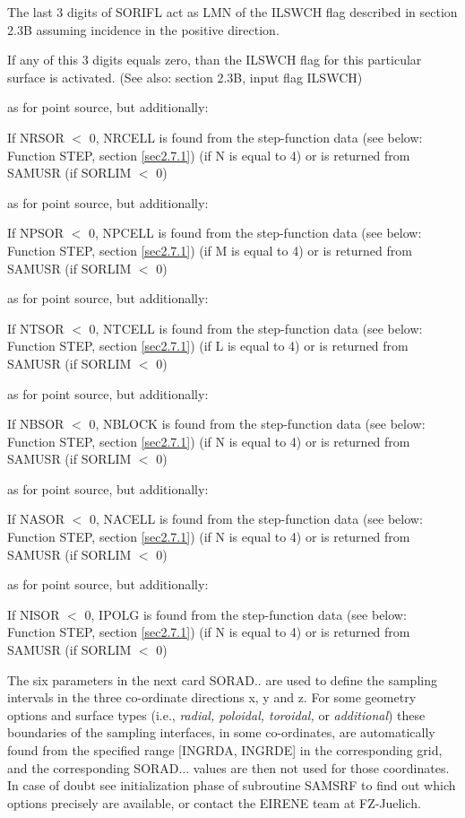 \begin{list}{ }{}
The last 3 digits of SORIFL act as LMN of the ILSWCH flag described
in section 2.3B assuming incidence in the positive direction.

If any of this 3 digits equals zero, than the ILSWCH flag for
this particular surface is activated. (See also: section 2.3B,
input flag ILSWCH)
\item[{\bf NRSOR }]
as for point source, but additionally:

If NRSOR  $<$   0, NRCELL is found from the step-function data (see
below: Function STEP,  section \ref{sec2.7.1}) (if N is equal to 4) or
is returned from SAMUSR  (if  SORLIM  $<$   0)
\item[{\bf NPSOR }]
as for point source, but additionally:

If NPSOR  $<$   0, NPCELL is found from the step-function data (see
below: Function STEP,  section \ref{sec2.7.1}) (if M is equal to 4) or
is returned from SAMUSR  (if  SORLIM  $<$   0)
\item[{\bf NTSOR }]
as for point source, but additionally:

If NTSOR  $<$   0, NTCELL is found from the step-function data (see
below: Function STEP,  section \ref{sec2.7.1}) (if L is equal to 4) or
is returned from SAMUSR  (if  SORLIM  $<$   0)
\item[{\bf NBSOR }]
as for point source, but additionally:

If NBSOR  $<$   0, NBLOCK is found from the step-function data (see
below: Function STEP,  section \ref{sec2.7.1}) (if N is equal to 4) or
is returned from SAMUSR  (if  SORLIM  $<$   0)
\item[{\bf NASOR }]
as for point source, but additionally:

If NASOR  $<$   0, NACELL is found from the step-function data (see
below: Function STEP, section \ref{sec2.7.1}) (if N is equal to 4) or
is returned from SAMUSR  (if  SORLIM  $<$   0)
\item[{\bf NISOR }]
as for point source, but additionally:

If NISOR $<$  0, IPOLG is found from the step-function data (see
below: Function STEP, section \ref{sec2.7.1}) (if N is equal to 4) or
is returned from SAMUSR  (if  SORLIM $ < $  0)
\end{list}
The six parameters in the next card SORAD.. are used to define the
sampling intervals in the three co-ordinate directions x, y and z.
For some geometry options and surface types (i.e., \emph{radial,
poloidal, toroidal,} or \emph{additional}) these boundaries of the
sampling interfaces, in some co-ordinates, are automatically found
from the specified range [INGRDA, INGRDE] in the corresponding grid,
and the corresponding SORAD... values are then not used for those
coordinates. In case of doubt see initialization phase of subroutine
SAMSRF to find out which options precisely are available, or contact
the EIRENE team at FZ-Juelich.

